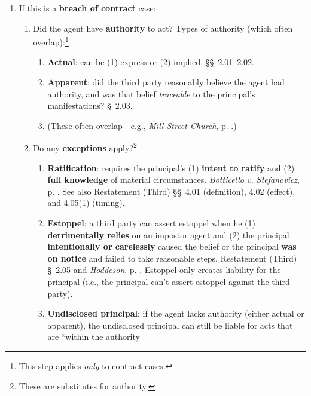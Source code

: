 \begin{enumerate}
\begin{enumerate}
    \end{enumerate}
    \item If this is a \textbf{breach of contract} case:
    \begin{enumerate}
        \item Did the agent have \textbf{authority} to act? Types of authority 
        (which often overlap):\footnote{This step applies \emph{only} to 
        contract cases.}
        \begin{enumerate}
            \item \textbf{Actual}: can be (1) express or (2) implied. \S\S\ 
            2.01--2.02.
            \item \textbf{Apparent}: did the third party reasonably believe 
            the agent had authority, and was that belief \emph{traceable} to 
            the principal's manifestations? \S\ 2.03.
            \item (These often overlap---e.g., \emph{Mill Street Church}, p.  
            \pageref{par:mill}.)
        \end{enumerate}
        \item Do any \textbf{exceptions} apply?\footnote{These are substitutes 
        for authority.}
        \begin{enumerate}
            \item \textbf{Ratification}: requires the principal's (1) 
            \textbf{intent to ratify} and (2) \textbf{full knowledge} of 
            material circumstances. \emph{Botticello v. Stefanovicz}, p.  
            \pageref{par:botticello}. See also Restatement (Third) \S\S\ 4.01 
            (definition), 4.02 (effect), and 4.05(1) (timing).
            \item \textbf{Estoppel}: a third party can assert estoppel when 
            he (1) \textbf{detrimentally relies} on an impostor agent and (2) 
            the principal \textbf{intentionally or carelessly} caused the 
            belief or the principal \textbf{was on notice} and failed to take 
            reasonable steps. Restatement (Third) \S\ 2.05 and 
            \emph{Hoddeson}, p. \pageref{par:hodd}.
            Estoppel only creates liability for the 
            principal (i.e., the principal can't assert estoppel against the 
            third party).
            \item \textbf{Undisclosed principal}: if the agent lacks 
            authority (either actual or apparent), the undisclosed principal 
            can still be liable for acts that are ``within the authority 

\end{enumerate}
\end{enumerate}
\end{enumerate}
